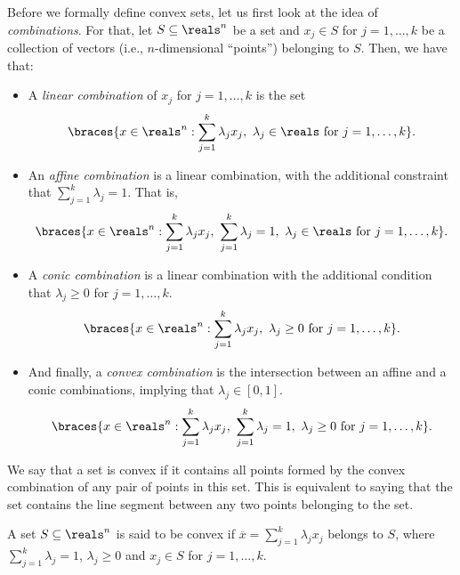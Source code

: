 Before we formally define convex sets, let us first look at the idea of \emph{combinations}. For that, let $S \subseteq \reals^n$ be a set and $x_j \in S$ for $j=1,\dots,k$ be a collection of vectors (i.e., $n$-dimensional ``points'') belonging to $S$. Then, we have that:
%
\begin{itemize} 
	\item A \emph{linear combination} of $x_j$ for $j=1,\dots, k$ is the set 
%
	\begin{align}
		\braces{x \in \reals^n : \sum_{j=1}^k \lambda_jx_j, \ \lambda_j \in \reals \text{ for } j=1,\dots, k}.
	\end{align}
%
	\item An \emph{affine combination} is a linear combination, with the additional constraint that $\sum_{j=1}^k \lambda_j = 1$. That is,
%
	\begin{align}
		\braces{x \in \reals^n : \sum_{j=1}^k \lambda_jx_j, \ \sum_{j=1}^k \lambda_j = 1, \ \lambda_j \in \reals \text{ for } j=1, \dots, k}.
	\end{align}
%
	\item A \emph{conic combination} is a linear combination with the additional condition that $\lambda_j \geq 0$ for $j = 1,\dots,k$.
%
	\begin{align}
		\braces{x \in \reals^n : \sum_{j=1}^k \lambda_jx_j, \ \lambda_j \geq 0 \text{ for } j=1,\dots,k}.
	\end{align}
%
	\item And finally, a \emph{convex combination} is the intersection between an affine and a conic combinations, implying that $\lambda_j \in [0,1]$.  
%
	\begin{align}
		\braces{x \in \reals^n : \sum_{j=1}^k \lambda_jx_j, \ \sum_{j=1}^k \lambda_j = 1, \ \lambda_j \geq 0 \text{ for } j=1,\dots,k}.
	\end{align}
% 
\end{itemize}

We say that a set is convex if it contains all points formed by the convex combination of any pair of points in this set. This is equivalent to saying that the set contains the line segment between any two points belonging to the set. 

\begin{definition} \label{def:convex_sets}
	A set $S \subseteq \reals^n$ is said to be convex if $\overline{x} = \sum_{j=1}^k \lambda_jx_j$ belongs to $S$, where $\sum_{j=1}^k \lambda_j = 1$, $\lambda_j \geq 0$ and $x_j \in S$ for $j=1,\dots, k$.
\end{definition}

